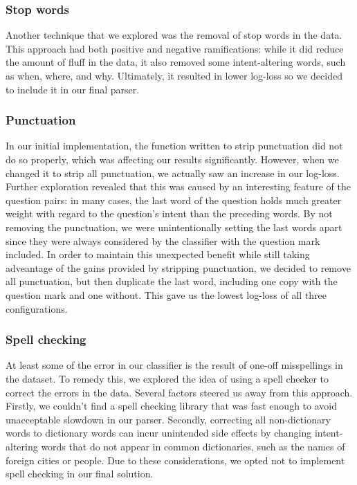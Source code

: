\documentclass{article}
\begin{document}
\subsubsection{Stop words}

Another technique that we explored was the removal of stop words in the data.
This approach had both positive and negative ramifications: while it did reduce
the amount of fluff in the data, it also removed some intent-altering words,
such as when, where, and why. Ultimately, it resulted in lower log-loss so we
decided to include it in our final parser.

\subsubsection{Punctuation}

In our initial implementation, the function written to strip punctuation did not do
so properly, which was affecting our results significantly. However, when we
changed it to strip all punctuation, we actually saw an increase in our
log-loss. Further exploration revealed that this was caused by an interesting
feature of the question pairs: in many cases, the last word of the question holds
much greater weight with regard to the question's intent than the preceding
words. By not removing the punctuation, we were unintentionally setting the last
words apart since they were always considered by the classifier with the
question mark included. In order to maintain this unexpected benefit while still
taking adveantage of the gains provided by stripping punctuation, we decided to
remove all punctuation, but then duplicate the last word, including one copy
with the question mark and one without. This gave us the lowest log-loss of all
three configurations.

\subsubsection{Spell checking}

At least some of the error in our classifier is the result of one-off misspellings
in the dataset. To remedy this, we explored the idea of using a spell checker to
correct the errors in the data. Several factors steered us away from this
approach. Firstly, we couldn't find a spell checking library that was fast
enough to avoid unacceptable slowdown in our parser. Secondly, correcting all
non-dictionary words to dictionary words can incur unintended side effects by
changing intent-altering words that do not appear in common dictionaries, such
as the names of foreign cities or people. Due to these considerations, we opted
not to implement spell checking in our final solution.
\end{document}
